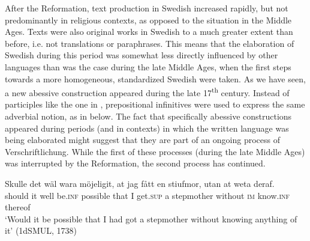 \documentclass[output=paper]{langscibook}
\begin{document}
After the Reformation, text production in Swedish increased rapidly, but not predominantly in religious contexts, as opposed to the situation in the Middle Ages. Texts were also original works in Swedish to a much greater extent than before, i.e. not translations or paraphrases. This means that the elaboration of Swedish during this period was somewhat less directly influenced by other languages than was the case during the late Middle Ages, when the first steps towards a more homogeneous, standardized Swedish were taken. As we have seen, a new abessive construction appeared during the late 17\textsuperscript{th} century. Instead of participles like the one in , prepositional infinitives were used to express the same adverbial notion, as in  below. The fact that specifically abessive constructions appeared during periods (and in contexts) in which the written language was being elaborated might suggest that they are part of an ongoing process of Verschriftlichung. While the first of these processes (during the late Middle Ages) was interrupted by the Reformation, the second process has continued. 


\ea
\label{ex:kalm:34}
 \gll Skulle det wäl wara möjeligit, at jag fått en stiufmor, utan at weta deraf.\\
should it well be.\textsc{inf} possible that I get.\textsc{sup} a stepmother without \textsc{im} know.\textsc{inf} thereof\\
\glt ‘Would it be possible that I had got a stepmother without knowing anything of it’ (1dSMUL, 1738)
\z
\end{document}

